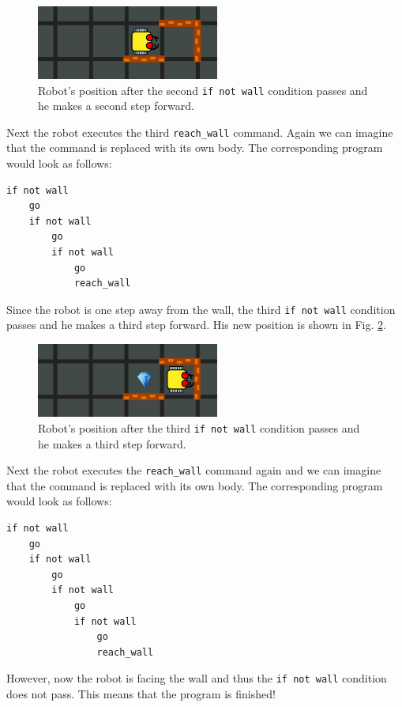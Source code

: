 \begin{figure}[!ht]
\begin{center}
\includegraphics[width=6cm]{imgk/rec-3.png}
\end{center}
\vspace{-4mm}
\caption{Robot's position after the second {\tt if not wall} condition passes and he makes a second step forward.}
\label{fig:rec3}
\vspace{-4mm}
\end{figure}
\noindent
Next the robot executes the third {\tt reach\_wall} command. Again we can imagine that the command 
is replaced with its own body. The corresponding program would look as follows:

\begin{verbatim}
if not wall
    go
    if not wall
        go
        if not wall
            go
            reach_wall
\end{verbatim}
\noindent
Since the robot is one step away from the wall, the third {\tt if not wall} condition passes and 
he makes a third step forward. His new position is shown in Fig. \ref{fig:rec4}.

\begin{figure}[!ht]
\begin{center}
\includegraphics[width=6cm]{imgk/rec-4.png}
\end{center}
\vspace{-4mm}
\caption{Robot's position after the third {\tt if not wall} condition passes and he makes a third step forward.}
\label{fig:rec4}
\end{figure}
\noindent
Next the robot executes the {\tt reach\_wall} command again and we can imagine that the command 
is replaced with its own body. The corresponding program would look as follows:

\begin{verbatim}
if not wall
    go
    if not wall
        go
        if not wall
            go
            if not wall
                go
                reach_wall
\end{verbatim}
\noindent
However, now the robot is facing the wall and thus the {\tt if not wall} condition does not pass.  
This means that the program is finished!

